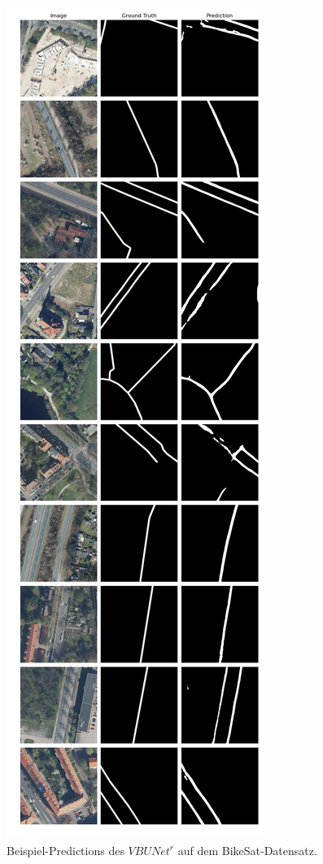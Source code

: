 \begin{figure}
	\centering
	\includegraphics[width=.41\textwidth]{Bilder/Samples-BikeSat/vbunet-r.png} 
	\caption{Beispiel-Predictions des $VBUNet^r$ auf dem BikeSat-Datensatz.}
	\label{fig:bikesat-samples-vbunet-r}
\end{figure}

